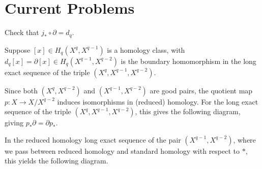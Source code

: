 \documentclass[10pt]{mypackage}
\begin{document}
\section{Current Problems}%
\begin{problem}
  Check that $j_{\ast}\circ \partial = d_q$.
\end{problem}
\begin{solution}
  Suppose $\left[ x \right]\in H_q\left( X^q,X^{q-1} \right)$ is a homology class, with $d_q\left[ x \right] = \partial \left[ x \right]\in H_q\left( X^{q-1},X^{q-2} \right)$ is the boundary homomorphism in the long exact sequence of the triple $\left( X^q,X^{q-1},X^{q-2} \right)$.

  Since both $\left( X^q,X^{q-2} \right)$ and $\left( X^{q-1},X^{q-2} \right)$ are good pairs, the quotient map $p\colon X\rightarrow X/X^{q-2}$ induces isomorphisms in (reduced) homology. For the long exact sequence of the triple $\left( X^{q},X^{q-1},X^{q-2} \right)$, this gives the following diagram, giving $p_{\ast}\partial = \partial p_{\ast}$.
  \begin{center}
  \end{center}
  In the reduced homology long exact sequence of the pair $\left( X^{q-1},X^{q-2} \right)$, where we pass between reduced homology and standard homology with respect to $\ast$, this yields the following diagram.
  \begin{center}

\end{center}
\end{solution}
\end{document}
